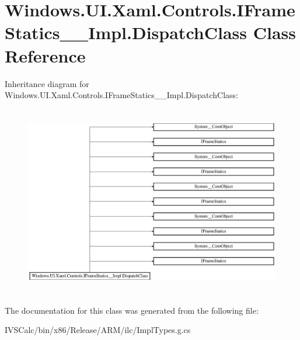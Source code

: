 \hypertarget{class_windows_1_1_u_i_1_1_xaml_1_1_controls_1_1_i_frame_statics_____impl_1_1_dispatch_class}{}\section{Windows.\+U\+I.\+Xaml.\+Controls.\+I\+Frame\+Statics\+\_\+\+\_\+\+Impl.\+Dispatch\+Class Class Reference}
\label{class_windows_1_1_u_i_1_1_xaml_1_1_controls_1_1_i_frame_statics_____impl_1_1_dispatch_class}
Inheritance diagram for Windows.\+U\+I.\+Xaml.\+Controls.\+I\+Frame\+Statics\+\_\+\+\_\+\+Impl.\+Dispatch\+Class\+:\begin{figure}[H]
\begin{center}
\leavevmode
\includegraphics[height=8.369565cm]{class_windows_1_1_u_i_1_1_xaml_1_1_controls_1_1_i_frame_statics_____impl_1_1_dispatch_class}
\end{center}
\end{figure}


The documentation for this class was generated from the following file\+:\begin{DoxyCompactItemize}
\item 
I\+V\+S\+Calc/bin/x86/\+Release/\+A\+R\+M/ilc/Impl\+Types.\+g.\+cs\end{DoxyCompactItemize}
